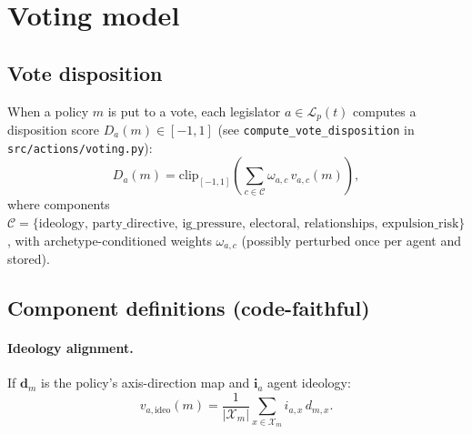 \documentclass[11pt]{article}
\begin{document}
\section{Voting model}
\subsection{Vote disposition}
When a policy $m$ is put to a vote, each legislator $a \in \mathcal{L}_p(t)$
computes a disposition score $D_a(m) \in [-1,1]$ (see \texttt{compute\_vote\_disposition}
in \texttt{src/actions/voting.py}):
\[
  D_a(m) = \mathrm{clip}_{[-1,1]}\left(
  \sum_{c \in \mathcal{C}} \omega_{a,c}\, v_{a,c}(m)
  \right),
\]
where components $\mathcal{C}=\{\text{ideology, party\_directive, ig\_pressure, electoral, relationships, expulsion\_risk}\}$,
with archetype-conditioned weights $\omega_{a,c}$ (possibly perturbed once per agent and stored).

\begin{center}
\end{center}

\subsection{Component definitions (code-faithful)}
\paragraph{Ideology alignment.}
If $\mathbf{d}_m$ is the policy's axis-direction map and $\mathbf{i}_a$ agent ideology:
\[
  v_{a,\text{ideo}}(m) = \frac{1}{|\mathcal{X}_m|}\sum_{x \in \mathcal{X}_m} i_{a,x}\, d_{m,x}.
\]
\end{document}

